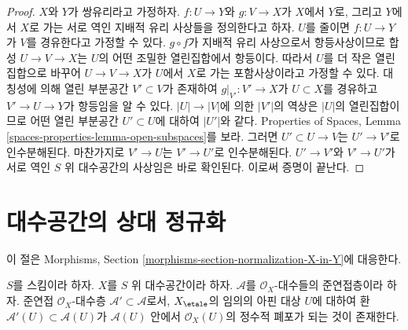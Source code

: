 \begin{proof}
$X$와 $Y$가 쌍유리라고 가정하자. $f : U \to Y$와 $g : V \to X$가
$X$에서 $Y$로, 그리고 $Y$에서 $X$로 가는 서로 역인 지배적 유리
사상들을 정의한다고 하자. $U$를 줄이면 $f : U \to Y$가 $V$를
경유한다고 가정할 수 있다. $g \circ f$가 지배적 유리 사상으로서
항등사상이므로 합성 $U \to V \to X$는 $U$의 어떤 조밀한 열린집합에서
항등이다. 따라서 $U$를 더 작은 열린집합으로 바꾸어
$U \to V \to X$가 $U$에서 $X$로 가는 포함사상이라고 가정할 수 있다.
대칭성에 의해 열린 부분공간 $V' \subset V$가 존재하여
$g|_{V'} : V' \to X$가 $U \subset X$를 경유하고 $V' \to U \to Y$가
항등임을 알 수 있다. $|U| \to |V|$에 의한 $|V'|$의 역상은 $|U|$의
열린집합이므로 어떤 열린 부분공간 $U' \subset U$에 대하여 $|U'|$와
같다. Properties of Spaces, Lemma
\ref{spaces-properties-lemma-open-subspaces}를 보라. 그러면
$U' \subset U \to V$는 $U' \to V'$로 인수분해된다. 마찬가지로
$V' \to U$는 $V' \to U'$로 인수분해된다. $U' \to V'$와
$V' \to U'$가 서로 역인 $S$ 위 대수공간의 사상임은 바로 확인된다.
이로써 증명이 끝난다.
\end{proof}
\section{대수공간의 상대 정규화}
\label{section-normalization-X-in-Y}

\noindent
이 절은 Morphisms, Section
\ref{morphisms-section-normalization-X-in-Y}에 대응한다.

\begin{lemma}
\label{lemma-integral-closure}
$S$를 스킴이라 하자. $X$를 $S$ 위 대수공간이라 하자.
$\mathcal{A}$를 $\mathcal{O}_X$-대수들의 준연접층이라 하자.
준연접 $\mathcal{O}_X$-대수층 $\mathcal{A}' \subset \mathcal{A}$로서,
$X_\etale$의 임의의 아핀 대상 $U$에 대하여 환
$\mathcal{A}'(U) \subset \mathcal{A}(U)$가 $\mathcal{A}(U)$ 안에서
$\mathcal{O}_X(U)$의 정수적 폐포가 되는 것이 존재한다.
\end{lemma}

